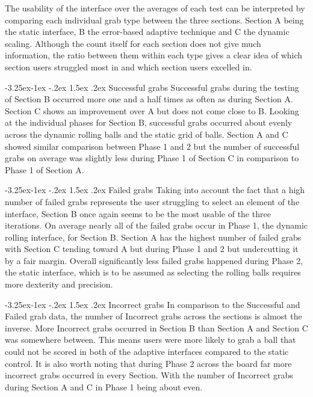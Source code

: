\documentclass[12pt]{article}
\makeatletter
\renewcommand{\subsubsection}{\@startsection{subsubsection}{2}{\z@}%
             {-3.25ex\@plus -1ex \@minus -.2ex}%
             {1.5ex \@plus .2ex}%
             {\normalfont\normalsize\scshape\bfseries}}
\makeatother
\begin{document}
The usability of the interface over the averages of each test can be interpreted by comparing each individual grab type between the three sections. Section A being the static interface, B the error-based adaptive technique and C the dynamic scaling. Although the count itself for each section does not give much information, the ratio between them within each type gives a clear idea of which section users struggled most in and which section users excelled in. 

\subsubsection{Successful grabs}
Successful grabs during the testing of Section B occurred more one and a half times as often as during Section A. Section C shows an improvement over A but does not come close to B. Looking at the individual phases for Section B, successful grabs occurred about evenly across the dynamic rolling balls and the static grid of balls. Section A and C showed similar comparison between Phase 1 and 2 but the number of successful grabs on average was slightly less during Phase 1 of Section C in comparison to Phase 1 of Section A.  

\subsubsection{Failed grabs}
Taking into account the fact that a high number of failed grabs represents the user struggling to select an element of the interface, Section B once again seems to be the most usable of the three iterations. On average nearly all of the failed grabs occur in Phase 1, the dynamic rolling interface, for Section B. Section A has the highest number of failed grabs with Section C tending toward A but during Phase 1 and 2 but undercutting it by a fair margin. Overall significantly less failed grabs happened during Phase 2, the static interface, which is to be assumed as selecting the rolling balls requires more dexterity and precision.

\subsubsection{Incorrect grabs}
In comparison to the Successful and Failed grab data, the number of Incorrect grabs across the sections is almost the inverse. More Incorrect grabs occurred in Section B than Section A and Section C was somewhere between. This means users were more likely to grab a ball that could not be scored in both of the adaptive interfaces compared to the static control. It is also worth noting that during Phase 2 across the board far more incorrect grabs occurred in every Section. With the number of Incorrect grabs during Section A and C in Phase 1 being about even.
\end{document}
